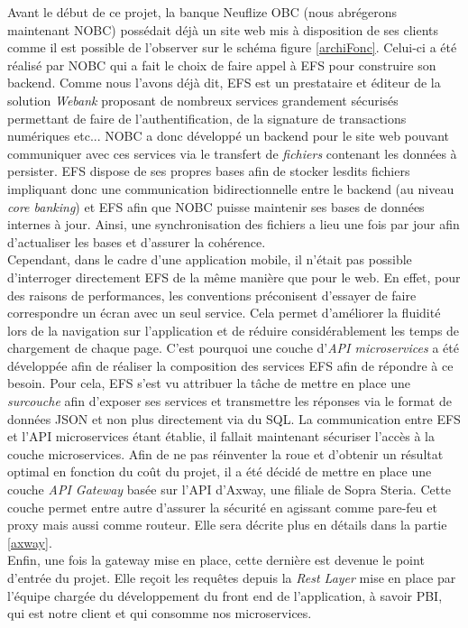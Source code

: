 	Avant le début de ce projet, la banque Neuflize OBC (nous abrégerons maintenant NOBC) possédait déjà un site web mis à disposition de ses clients comme il est possible de l'observer sur le schéma figure \ref{archiFonc}. Celui-ci a été réalisé par NOBC qui a fait le choix de faire appel à EFS pour construire son backend. Comme nous l'avons déjà dit, EFS est un prestataire et éditeur de la solution \textit{Webank} proposant de nombreux services grandement sécurisés permettant de faire de l'authentification, de la signature de transactions numériques etc... NOBC a donc développé un backend pour le site web pouvant communiquer avec ces services via le transfert de \textit{fichiers} contenant les données à persister. EFS dispose de ses propres bases afin de stocker lesdits fichiers impliquant donc une communication bidirectionnelle entre le backend (au niveau \textit{core banking}) et EFS afin que NOBC puisse maintenir ses bases de données internes à jour. Ainsi, une synchronisation des fichiers a lieu une fois par jour afin d'actualiser les bases et d'assurer la cohérence. \\
	
	Cependant, dans le cadre d'une application mobile, il n'était pas possible d'interroger directement EFS de la même manière que pour le web. En effet, pour des raisons de performances, les conventions préconisent d'essayer de faire correspondre un écran avec un seul service. Cela permet d'améliorer la fluidité lors de la navigation sur l'application et de réduire considérablement les temps de chargement de chaque page. C'est pourquoi une couche d'\textit{API microservices} a été développée afin de réaliser la composition des services EFS afin de répondre à ce besoin. Pour cela, EFS s'est vu attribuer la tâche de mettre en place une \textit{surcouche} afin d'exposer ses services et transmettre les réponses via le format de données JSON et non plus directement via du SQL. La communication entre EFS et l'API microservices étant établie, il fallait maintenant sécuriser l'accès à la couche microservices. Afin de ne pas réinventer la roue et d'obtenir un résultat optimal en fonction du coût du projet, il a été décidé de mettre en place une couche \textit{API Gateway} basée sur l'API d'Axway, une filiale de Sopra Steria. Cette couche permet entre autre d'assurer la sécurité en agissant comme pare-feu et proxy mais aussi comme routeur. Elle sera décrite plus en détails dans la partie \ref{axway}.\\
	
	Enfin, une fois la gateway mise en place, cette dernière est devenue le point d'entrée du projet. Elle reçoit les requêtes depuis la \textit{Rest Layer} mise en place par l'équipe chargée du développement du front end de l'application, à savoir PBI, qui est notre client et qui consomme nos microservices. \\

